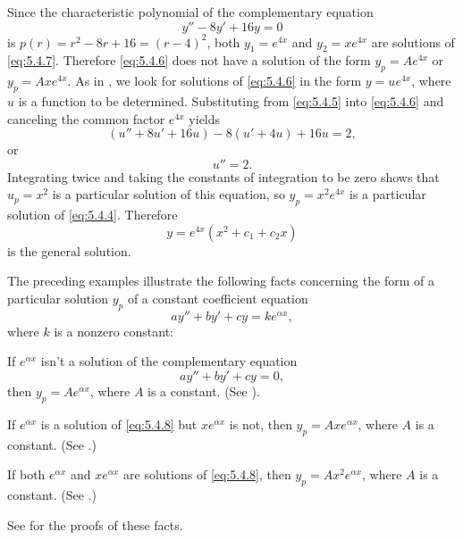 \begin{solution}
Since the characteristic polynomial of the complementary equation
\begin{equation} \label{eq:5.4.7}
y''-8y'+16y=0
\end{equation}
is $p(r)=r^2-8r+16=(r-4)^2$, both $y_1=e^{4x}$ and $y_2=xe^{4x}$ are
solutions of \eqref{eq:5.4.7}. Therefore \eqref{eq:5.4.6} does not have a
solution of the form $y_p=Ae^{4x}$ or $y_p=Axe^{4x}$. As in
, we look for solutions of \eqref{eq:5.4.6} in the
form $y=ue^{4x}$, where $u$ is a function to be determined.
Substituting from \eqref{eq:5.4.5} into \eqref{eq:5.4.6} and canceling the
common factor $e^{4x}$ yields
\[
(u''+8u'+16u)-8(u'+4u)+16u=2,
\]
or
\[
u''=2.
\]
Integrating twice and taking the constants of integration to be zero
shows that $u_p=x^2$ is a particular solution of this equation, so
$y_p=x^2e^{4x}$ is a particular solution of \eqref{eq:5.4.4}. Therefore
\[
y=e^{4x}(x^2+c_1+c_2x)
\]
is the general solution.
\end{solution}

The preceding examples illustrate the following facts concerning
the form of a particular solution $y_p$
of a constant coefficient equation
\[
ay''+by'+cy=ke^{\alpha x},
\]
where $k$ is a nonzero constant:

\medskip

\begin{alist}
\item %
If $e^{\alpha x}$ isn't  a solution of the complementary
equation
\begin{equation} \label{eq:5.4.8}
ay''+by'+cy=0,
\end{equation}
then  $y_p=Ae^{\alpha x}$, where $A$ is a constant. (See
).
\item %
If $e^{\alpha x}$ is a solution of \eqref{eq:5.4.8} but $xe^{\alpha x}$
is not, then  $y_p=Axe^{\alpha x}$,  where $A$ is a constant.
(See .)
\item %
If both $e^{\alpha x}$ and $xe^{\alpha x}$ are solutions of \eqref{eq:5.4.8},
then  $y_p=Ax^2e^{\alpha x}$,  where $A$ is a constant.
(See .)
\end{alist}
See   for the proofs of these facts.

